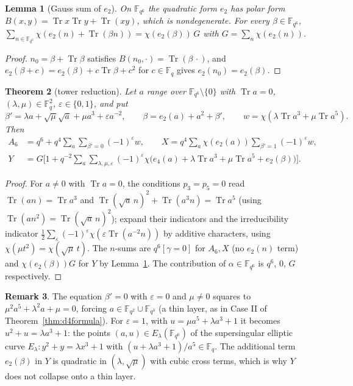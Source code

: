 \documentclass[11pt,a4paper]{amsart}
\newtheorem{theorem}{Theorem}[section]
\newtheorem{lemma}[theorem]{Lemma}
\theoremstyle{definition}
\newtheorem{remark}[theorem]{Remark}
\newcommand{\F}{\mathbb{F}}
\newcommand{\Tr}{\operatorname{Tr}}
\newcommand{\eps}{\varepsilon}
\begin{document}
\begin{lemma}[Gauss sum of $e_2$]\label{lem:gauss}
On $\F_{q^6}$ the quadratic form $e_2$ has polar form $B(x,y)=\Tr x\Tr y+\Tr(xy)$, which is nondegenerate. For every $\beta\in\F_{q^6}$,
$\sum_{n\in\F_{q^6}}\chi(e_2(n)+\Tr(\beta n))=\chi(e_2(\beta))\,G$ with $G=\sum_n\chi(e_2(n))$.
\end{lemma}
\begin{proof}
$n_0=\beta+\Tr\beta$ satisfies $B(n_0,\cdot)=\Tr(\beta\,\cdot)$, and $e_2(\beta+c)=e_2(\beta)+c\Tr\beta+c^2$ for $c\in\F_q$ gives $e_2(n_0)=e_2(\beta)$.
\end{proof}

\begin{theorem}[tower reduction]\label{thm:towerred}
Let $a$ range over $\F_{q^6}\setminus\{0\}$ with $\Tr a=0$, $(\lambda,\mu)\in\F_q^2$, $\eps\in\{0,1\}$, and put
\[
\beta'=\lambda a+\sqrt\mu\sqrt a+\mu a^3+\eps a^{-2},\qquad \beta=e_2(a)+a^2+\beta',\qquad w=\chi(\lambda\Tr a^3+\mu\Tr a^5).
\]
Then
\begin{align*}
A_6&=q^6+q^4\sum_a\sum_{\beta'=0}(-1)^\eps w,\qquad
X=q^4\sum_a\chi(e_2(a))\sum_{\beta'=1}(-1)^\eps w,\\
Y&=G\Big[1+q^{-2}\sum_a\sum_{\lambda,\mu,\eps}(-1)^\eps\chi\bigl(e_4(a)+\lambda\Tr a^3+\mu\Tr a^5+e_2(\beta)\bigr)\Big].
\end{align*}
\end{theorem}
\begin{proof}
For $a\ne0$ with $\Tr a=0$, the conditions $p_3=p_5=0$ read $\Tr(an)=\Tr a^3$ and $\Tr(\sqrt a\,n)^2+\Tr(a^3n)=\Tr a^5$ (using $\Tr(an^2)=\Tr(\sqrt a\,n)^2$); expand their indicators and the irreducibility indicator $\frac12\sum_\eps(-1)^\eps\chi(\eps\Tr(a^{-2}n))$ by additive characters, using $\chi(\mu t^2)=\chi(\sqrt\mu\,t)$. The $n$-sums are $q^6[\gamma=0]$ for $A_6,X$ (no $e_2(n)$ term) and $\chi(e_2(\beta))G$ for $Y$ by Lemma~\ref{lem:gauss}. The contribution of $\alpha\in\F_{q^6}$ is $q^6$, $0$, $G$ respectively.
\end{proof}

\begin{remark}\label{rem:thin}
The equation $\beta'=0$ with $\eps=0$ and $\mu\ne0$ squares to $\mu^2a^5+\lambda^2a+\mu=0$, forcing $a\in\F_{q^2}\cup\F_{q^3}$ (a thin layer, as in Case II of Theorem~\ref{thm:d4formula}). For $\eps=1$, with $u=\mu a^5+\lambda a^3+1$ it becomes $u^2+u=\lambda a^3+1$: the points $(a,u)\in E_\lambda(\F_{q^6})$ of the supersingular elliptic curve $E_\lambda:y^2+y=\lambda x^3+1$ with $(u+\lambda a^3+1)/a^5\in\F_q$. The additional term $e_2(\beta)$ in $Y$ is quadratic in $(\lambda,\sqrt\mu)$ with cubic cross terms, which is why $Y$ does not collapse onto a thin layer.
\end{remark}
\end{document}
